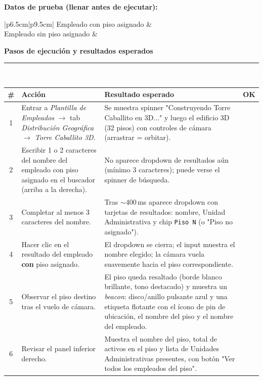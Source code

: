 \documentclass[11pt]{article}
\newcommand{\seccion}[1]{%
  \vspace{6pt}
  {\large\color{vino}\textbf{#1}}\\[2pt]
  {\color{oro}\rule{\linewidth}{1.2pt}}\\[6pt]
}
\newcommand{\chk}[1]{\CheckBox[name=#1,width=11pt,height=11pt,bordercolor=grisborde,backgroundcolor=1 1 1]{}}
\newcommand{\txtline}[3]{\TextField[name=#1,width=#2,height=13pt,bordercolor=grisborde,backgroundcolor=0.97 0.98 1]{#3}}
\begin{document}
\begin{Form}
\noindent\textbf{Datos de prueba (llenar antes de ejecutar):}\\[4pt]
\begin{tabular}{|p{6.5cm}|p{9.5cm}|}
\hline
Empleado con piso asignado & \txtline{dato_emp_con_piso}{8.8cm}{} \\ \hline
Empleado sin piso asignado & \txtline{dato_emp_sin_piso}{8.8cm}{} \\ \hline
\end{tabular}

\seccion{Pasos de ejecución y resultados esperados}

\begin{longtable}{|c|p{6.7cm}|p{6.7cm}|c|}
\hline
\rowcolor{grisclaro}
\textbf{\#} & \textbf{Acción} & \textbf{Resultado esperado} & \textbf{OK} \\ \hline
\endhead

1 &
Entrar a \emph{Plantilla de Empleados} $\to$ tab \emph{Distribución Geográfica} $\to$ \emph{Torre Caballito 3D}. &
Se muestra spinner "Construyendo Torre Caballito en 3D..." y luego el edificio 3D (32 pisos) con controles de cámara (arrastrar = orbitar). &
\chk{r1} \\ \hline

2 &
Escribir 1 o 2 caracteres del nombre del empleado con piso asignado en el buscador (arriba a la derecha). &
No aparece dropdown de resultados aún (mínimo 3 caracteres); puede verse el spinner de búsqueda. &
\chk{r2} \\ \hline

3 &
Completar al menos 3 caracteres del nombre. &
Tras $\sim$400\,ms aparece dropdown con tarjetas de resultados: nombre, Unidad Administrativa y chip \texttt{Piso N} (o "Piso no asignado"). &
\chk{r3} \\ \hline

4 &
Hacer clic en el resultado del empleado \textbf{con} piso asignado. &
El dropdown se cierra; el input muestra el nombre elegido; la cámara vuela suavemente hacia el piso correspondiente. &
\chk{r4} \\ \hline

5 &
Observar el piso destino tras el vuelo de cámara. &
El piso queda resaltado (borde blanco brillante, tono destacado) y muestra un \emph{beacon}: disco/anillo pulsante azul y una etiqueta flotante con el ícono de pin de ubicación, el nombre del piso y el nombre del empleado. &
\chk{r5} \\ \hline

6 &
Revisar el panel inferior derecho. &
Muestra el nombre del piso, total de activos en el piso y lista de Unidades Administrativas presentes, con botón "Ver todos los empleados del piso". &
\chk{r6} \\ \hline


\end{longtable}
\end{Form}
\end{document}
